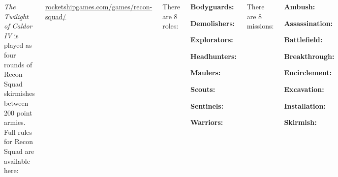 \clearpage
{}

\begin{columns}

  \emph{The Twilight of Caldor IV} is played as four rounds of Recon
  Squad skirmishes between 200 point armies.  Full rules for Recon
  Squad are available here:

\centerline{\url{rocketshipgames.com/games/recon-squad/}}


There are 8 roles:
\begin{squishitemize}
  \item \textbf{Bodyguards:}
  \item \textbf{Demolishers:}
  \item \textbf{Explorators:}
  \item \textbf{Headhunters:}
  \item \textbf{Maulers:}
  \item \textbf{Scouts:}
  \item \textbf{Sentinels:}
  \item \textbf{Warriors:}
\end{squishitemize}

There are 8 missions:
\begin{squishitemize}
\item \textbf{Ambush:}
\item \textbf{Assassination:}
\item \textbf{Battlefield:}
\item \textbf{Breakthrough:}
\item \textbf{Encirclement:}
\item \textbf{Excavation:}
\item \textbf{Installation:}
\item \textbf{Skirmish:}
\end{squishitemize}

\end{columns}

